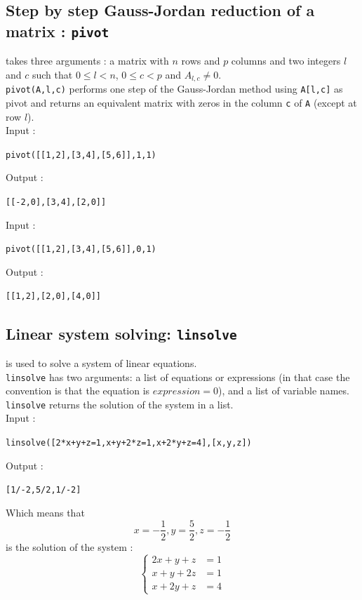 \documentclass[a4paper,11pt]{book}
\begin{document}
\subsection{Step by step Gauss-Jordan reduction of a matrix : {\tt pivot}}\label{sec:pivot}
 takes three arguments : a matrix with $n$ rows and $p$ 
columns and two integers $l$ and $c$ such that $0\leq l<n$, $0\leq c<p$
and $A_{l,c}\neq 0$.\\
{\tt pivot(A,l,c)} performs one step of the Gauss-Jordan method
using {\tt A[l,c]} as pivot and returns an equivalent matrix 
with zeros in the column {\tt c} of {\tt A} (except at row $l$).\\
Input  :
\begin{center}{\tt pivot([[1,2],[3,4],[5,6]],1,1)}\end{center}
Output  :
\begin{center}{\tt [[-2,0],[3,4],[2,0]]}\end{center}
Input  :
\begin{center}{\tt pivot([[1,2],[3,4],[5,6]],0,1)}\end{center}
Output  :
\begin{center}{\tt [[1,2],[2,0],[4,0]]}\end{center}

\subsection{Linear system solving: {\tt linsolve}}
 is used to solve a system of linear equations.\\
{\tt linsolve} has two arguments: a list of equations or
expressions (in that case the convention is that the equation 
is $expression = 0$), and a list of variable names.\\
{\tt linsolve} returns the solution of the system in a list.\\
Input :
\begin{center}{\tt linsolve([2*x+y+z=1,x+y+2*z=1,x+2*y+z=4],[x,y,z])}\end{center}
Output  :
\begin{center}{\tt  [1/-2,5/2,1/-2]}\end{center} 
Which means that
\[ x=-\frac{1}{2}, y=\frac{5}{2}, z=-\frac{1}{2} \]
is the solution of the system :
$$\left\{
\begin{array}{rl}
2x+y+z &=1\\
x+y+2z &=1\\
x+2y+z &=4
\end{array}
\right.$$ 
\end{document}
